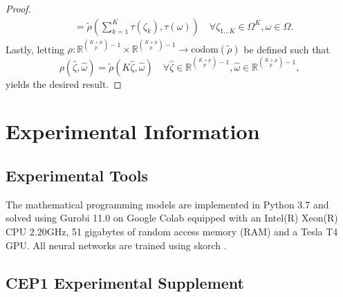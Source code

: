 \begin{proof}
\begin{align*}
&= \tilde{\rho} \left( \sum_{k = 1}^K \tau(\zeta_k),  \tau(\omega) \right) \quad \forall \zeta_{1...K} \in \Omega^{K}, \omega \in \Omega.
\end{align*}
Lastly, letting $\rho : \mathbb{R}^{{K+p \choose p}-1} \times \mathbb{R}^{{K+p \choose p}-1} \rightarrow \text{codom}(\tilde{\rho})$ be defined such that
$$
\rho(\hat{\zeta}, \hat{\omega}) = \tilde{\rho}(K \hat{\zeta}, \hat{\omega}) \quad \forall \hat{\zeta} \in \mathbb{R}^{{K+p \choose p}-1},  \hat{\omega} \in \mathbb{R}^{{K+p \choose p}-1},
$$
yields the desired result. 
\end{proof}
\section{Experimental Information}

\subsection{Experimental Tools}\label{appendix:experimental_tooling}
The mathematical programming models are implemented in Python 3.7 and solved using Gurobi 11.0 on \textsf{Google Colab} equipped with an Intel(R) Xeon(R) CPU 2.20GHz, 51 gigabytes of random access memory (RAM) and a Tesla T4 GPU. All neural networks are trained using \textsf{skorch} \citep{skorch}. 

\subsection{CEP1 Experimental Supplement}\label{appendix:cep1_formulation_data}
